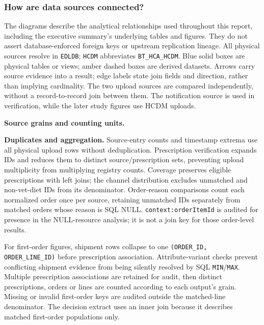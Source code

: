 \subsubsection{How are data sources connected?}
\label{subsec:data-source-connections}
The diagrams describe the analytical relationships used throughout this report,
including the executive summary's underlying tables and figures. They do not
assert database-enforced foreign keys or upstream replication lineage. All
physical sources resolve in \texttt{EDLDB}; \texttt{HCDM} abbreviates
\texttt{BT\_HCA\_HCDM}. Blue solid boxes are physical tables or views; amber
dashed boxes are derived datasets. Arrows carry source evidence into a result;
edge labels state join fields and direction, rather than implying cardinality.
The two upload sources are compared independently, without a record-to-record
join between them. The notification source is used in verification, while
the later study figures use HCDM uploads.




\clearpage
\noindent\textbf{Source grains and counting units.}



\noindent\textbf{Duplicates and aggregation.}
Source-entry counts and timestamp extrema use all physical upload rows without
deduplication. Prescription verification expands IDs and reduces them to distinct
source/prescription sets, preventing upload multiplicity from multiplying registry
counts. Coverage preserves eligible prescriptions with left joins; the channel
distribution excludes unmatched and non-vet-diet IDs from its denominator.
Order-reason comparisons count each normalized order once per source, retaining
unmatched IDs separately from matched orders whose reason is SQL NULL.
\texttt{context:orderItemId} is audited for presence in the NULL-resource analysis;
it is not a join key for those order-level results.

For first-order figures, shipment rows collapse to one
\texttt{(ORDER\_ID, ORDER\_LINE\_ID)} before prescription association.
Attribute-variant checks prevent conflicting shipment evidence from being silently
resolved by SQL \texttt{MIN}/\texttt{MAX}. Multiple prescription associations
are retained for audit, then distinct prescriptions, orders or lines are counted
according to each output's grain. Missing or invalid first-order keys are audited
outside the matched-line denominator. The decision extract uses an inner join
because it describes matched first-order populations only.

